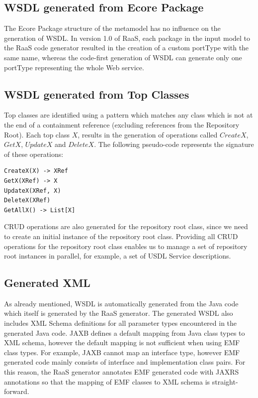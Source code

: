 \documentclass[11pt]{article}
\begin{document}
\subsection{WSDL generated from Ecore Package}

The Ecore Package structure of the metamodel has no influence on the generation of WSDL.
In version 1.0 of RaaS, each package in the input model to the RaaS code generator resulted in the creation of a custom portType with the same name, whereas the code-first generation of WSDL can generate only one portType representing the whole Web service.

\subsection{WSDL generated from Top Classes}

Top classes are identified using a pattern which matches any class which is not at the end of a containment reference (excluding references from the Repository Root). Each top class $X$, results in the generation of operations called $CreateX$, $GetX$, $UpdateX$ and $DeleteX$. The following pseudo-code represents the signature of these operations:
\begin{verbatim}
CreateX(X) -> XRef 
GetX(XRef) -> X 
UpdateX(XRef, X)
DeleteX(XRef)
GetAllX() -> List[X] 
\end{verbatim}

CRUD operations are also generated for the repository root class, since we need to create an initial instance of the repository root class. Providing all CRUD operations for the repository root class enables us to manage a set of repository root instances in parallel, for example, a set of USDL Service descriptions.

\subsection{Generated XML}

As already mentioned, WSDL is automatically generated from the Java code which itself is generated by the RaaS generator. The generated WSDL also includes XML Schema definitions for all parameter types encountered in the generated Java code. JAXB defines a default mapping from Java class types to XML schema, however the default mapping is not sufficient when using EMF class types. For example, JAXB cannot map an interface type, however EMF generated code mainly consists of interface and implementation class pairs.
For this reason, the RaaS generator annotates EMF generated code with JAXRS annotations so that the mapping of EMF classes to XML schema is straight-forward.   
\end{document}
